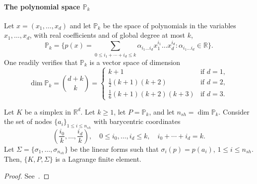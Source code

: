 
\paragraph{The polynomial space $\mathbb{P}_k$} Let $x = (x_1, \dots, x_d)$ and let $\mathbb{P}_k$ be the space of polynomials in the variables $x_1, \dots, x_d$, with real coefficients and of global degree at most $k$,
\begin{equation}
    \mathbb{P}_k = \{ p(x) = \sum_{0 \le i_1 + \cdots + i_d \le k} \alpha_{i_1 \dots i_d} x_1^{i_1} \dots x_d^{i_d} : \alpha_{i_1 \dots i_d} \in \mathbb{R} \}.
\end{equation}
One readily verifies that $\mathbb{P}_k$ is a vector space of dimension
\begin{equation*}
    \dim \mathbb{P}_k = \binom{d+k}{k} = \begin{cases} k+1 & \text{if } d=1, \\ \frac{1}{2}(k+1)(k+2) & \text{if } d=2, \\ \frac{1}{6}(k+1)(k+2)(k+3) & \text{if } d=3. \end{cases}
\end{equation*}
\begin{lemma}\label{lemma:simplicial_lagrange_fe}
    Let $K$ be a simplex in $\mathbb{R}^d$. Let $k \ge 1$, let $P = \mathbb{P}_k$, and let $n_{sh} = \dim \mathbb{P}_k$. Consider the set of nodes $\{a_i\}_{1 \le i \le n_{sh}}$ with barycentric coordinates
    \begin{equation*}
        \left(\frac{i_0}{k}, \dots, \frac{i_d}{k}\right), \quad 0 \le i_0, \dots, i_d \le k, \quad i_0 + \cdots + i_d = k.
    \end{equation*}
    Let $\Sigma = \{\sigma_1, \dots, \sigma_{n_{sh}}\}$ be the linear forms such that $\sigma_i(p) = p(a_i)$, $1 \le i \le n_{sh}$. Then, $\{K, P, \Sigma\}$ is a Lagrange finite element.
    \begin{proof}
        See~\cite[Exercise 1.3]{ern2004theory}.
    \end{proof}
\end{lemma}

